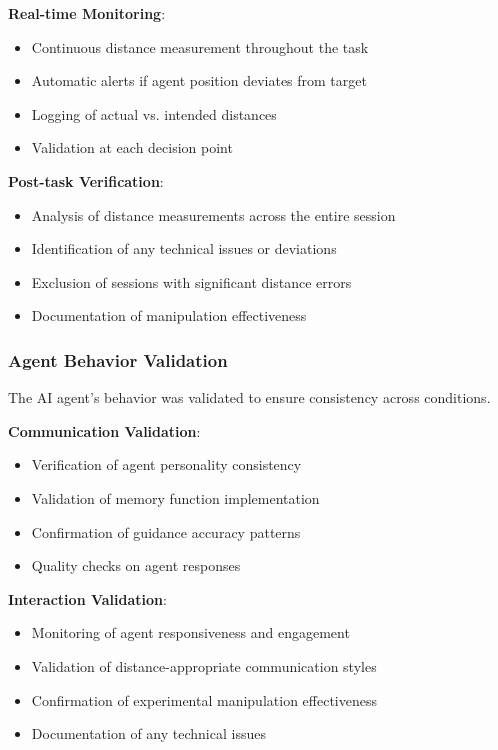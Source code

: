 \documentclass[12pt]{article}
\begin{document}
\textbf{Real-time Monitoring}:
\begin{itemize}
    \item Continuous distance measurement throughout the task
    \item Automatic alerts if agent position deviates from target
    \item Logging of actual vs. intended distances
    \item Validation at each decision point
\end{itemize}

\textbf{Post-task Verification}:
\begin{itemize}
    \item Analysis of distance measurements across the entire session
    \item Identification of any technical issues or deviations
    \item Exclusion of sessions with significant distance errors
    \item Documentation of manipulation effectiveness
\end{itemize}

\subsubsection{Agent Behavior Validation}

The AI agent's behavior was validated to ensure consistency across conditions.

\textbf{Communication Validation}:
\begin{itemize}
    \item Verification of agent personality consistency
    \item Validation of memory function implementation
    \item Confirmation of guidance accuracy patterns
    \item Quality checks on agent responses
\end{itemize}

\textbf{Interaction Validation}:
\begin{itemize}
    \item Monitoring of agent responsiveness and engagement
    \item Validation of distance-appropriate communication styles
    \item Confirmation of experimental manipulation effectiveness
    \item Documentation of any technical issues
\end{itemize}
\end{document}

